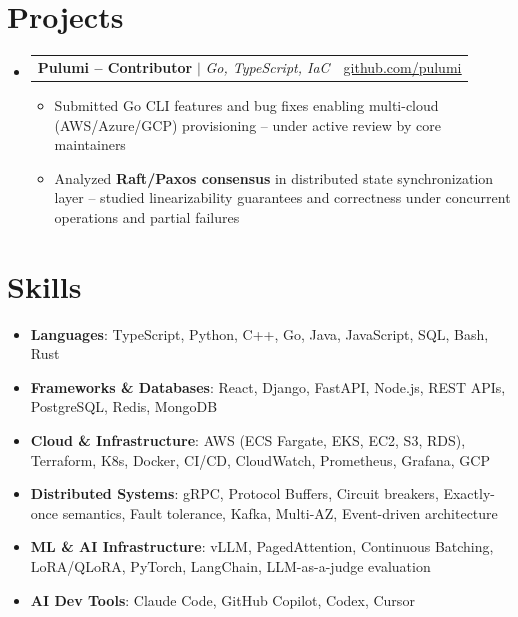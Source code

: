 \documentclass[letterpaper,11pt]{article}
\makeatletter
\newcommand{\resumeItem}[1]{\item\small{{#1 \vspace{-2pt}}}}
\newcommand{\resumeProjectHeading}[2]{%
  \vspace{-2pt}\item
    \begin{tabular*}{0.98\textwidth}[t]{l@{\extracolsep{\fill}}r}
      {\normalsize #1} & {\normalsize #2} \\
    \end{tabular*}\vspace{-7pt}
}
\newcommand{\resumeSubHeadingListStart}{\begin{itemize}[leftmargin=0.15in, label={}]}
\newcommand{\resumeSubHeadingListEnd}{\end{itemize}}
\newcommand{\resumeItemListStart}{\begin{itemize}}
\newcommand{\resumeItemListEnd}{\end{itemize}\vspace{-5pt}}
\newcommand{\resumeSkillHeading}[2]{\item\small{\textbf{#1}: #2 \vspace{-9pt}}}
\makeatother
\begin{document}
\section{Projects}
  \resumeSubHeadingListStart
    \resumeProjectHeading
      {\textbf{Pulumi -- Contributor} $|$ \emph{Go, TypeScript, IaC}}{\href{https://github.com/pulumi/pulumi}{\underline{github.com/pulumi}}}
      \resumeItemListStart
        \resumeItem{Submitted Go CLI features and bug fixes enabling multi-cloud (AWS/Azure/GCP) provisioning -- under active review by core maintainers}
        \resumeItem{Analyzed \textbf{Raft/Paxos consensus} in distributed state synchronization layer -- studied linearizability guarantees and correctness under concurrent operations and partial failures}
      \resumeItemListEnd
  \resumeSubHeadingListEnd

\section{Skills}
  \resumeSubHeadingListStart
    \resumeSkillHeading{Languages}{TypeScript, Python, C++, Go, Java, JavaScript, SQL, Bash, Rust}
    \resumeSkillHeading{Frameworks \& Databases}{React, Django, FastAPI, Node.js, REST APIs, PostgreSQL, Redis, MongoDB}
    \resumeSkillHeading{Cloud \& Infrastructure}{AWS (ECS Fargate, EKS, EC2, S3, RDS), Terraform, K8s, Docker, CI/CD, CloudWatch, Prometheus, Grafana, GCP}
    \resumeSkillHeading{Distributed Systems}{gRPC, Protocol Buffers, Circuit breakers, Exactly-once semantics, Fault tolerance, Kafka, Multi-AZ, Event-driven architecture}
    \resumeSkillHeading{ML \& AI Infrastructure}{vLLM, PagedAttention, Continuous Batching, LoRA/QLoRA, PyTorch, LangChain, LLM-as-a-judge evaluation}
    \resumeSkillHeading{AI Dev Tools}{Claude Code, GitHub Copilot, Codex, Cursor}
  \resumeSubHeadingListEnd
\end{document}
